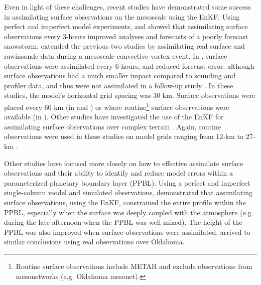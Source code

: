 Even in light of these challenges, recent studies have demonstrated some success in assimilating surface observations on the mesoscale using the EnKF. Using perfect and imperfect model experiments, \citet{zhangetal06} and \citet{mengzhang07} showed that assimilating surface observations every 3-hours improved analyses and forecasts of a poorly forecast snowstorm. \citet{mengzhang08a} extended the previous two studies by assimilating real surface and rawinsonde data during a mesoscale convective vortex event. In \citet{mengzhang08a}, surface observations were assimilated every 6-hours, and reduced forecast error, although surface observations had a much smaller impact compared to sounding and profiler data, and thus were not assimilated in a follow-up study \citep{mengzhang08b}. In these studies, the model’s horizontal grid spacing was 30 km. Surface observations were placed every 60 km (in \citealt{zhangetal06} and \citealt{mengzhang07}) or where routine\footnote{Routine surface observations include METAR and exclude observations from mesonetworks (e.g. Oklahoma mesonet).} surface observations were available (in \citealt{mengzhang08a}). Other studies have investigated the use of the EnKF for assimilating surface observations over complex terrain \citep{puetal13,ancelletal11}. Again, routine observations were used in these studies on model grids ranging from 12-km \citep{ancelletal11} to 27-km \citep{puetal13}.

Other studies have focused more closely on how to effective assimilate surface observations and their ability to identify and reduce model errors within a parameterized planetary boundary layer (PPBL). Using a perfect and imperfect single-column model and simulated observations, \citet{hackersnyder05} demonstrated that assimilating surface observations, using the EnKF, constrained the entire profile within the PPBL, especially when the surface was deeply coupled with the atmosphere (e.g. during the late afternoon when the PPBL was well-mixed). The height of the PPBL was also improved when surface observations were assimilated. \citet{hackeredelstein07} arrived to similar conclusions using real observations over Oklahoma.

